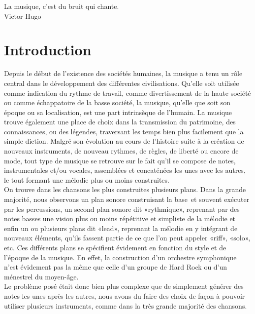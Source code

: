 \documentclass[12pt, a4paper]{article}
\begin{document}
    \tableofcontents
    
    \begin{center}
        La musique, c’est du bruit qui chante.\\
        Victor Hugo
    \end{center}
    
    \section*{Introduction}
        Depuis le début de l’existence des sociétés humaines, la musique a tenu un rôle central dans le développement des différentes civilisations.  Qu’elle soit utilisée comme indication du rythme de travail, comme divertissement de la haute société ou comme échappatoire de la basse société, la musique, qu’elle que soit son époque ou sa localisation, est une part intrinsèque de l’humain. La musique trouve également une place de choix dans la transmission du patrimoine, des connaissances, ou des légendes, traversant les temps bien plus facilement que la simple diction. Malgré son évolution au cours de l’histoire suite à la création de nouveaux instruments, de nouveau rythmes, de règles, de liberté ou encore de mode, tout type de musique se retrouve sur le fait qu’il se compose de notes, instrumentales et/ou vocales, assemblées et concaténées les unes avec les autres, le tout formant une mélodie plus ou moins construites.\\
        
        On trouve dans les chansons les plus construites plusieurs plans. Dans la grande majorité, nous observons un plan sonore construisant la base et souvent exécuter par les percussions, un second plan sonore dit «rythmique», reprenant par des notes basses une vision plus ou moins répétitive et simpliste de la mélodie et enfin un ou plusieurs plans dit «lead», reprenant la mélodie en y intégrant de nouveaux éléments, qu’ils fassent partie de ce que l’on peut appeler «riff», «solo», etc. Ces différents plans se spécifient évidement en fonction du style et de l’époque de la musique. En effet, la construction d’un orchestre symphonique n’est évidement pas la même que celle d’un groupe de Hard Rock ou d’un ménestrel du moyen-âge.\\
        
        Le problème posé était donc bien plus complexe que de simplement générer des notes les unes après les autres, nous avons du faire des choix de façon à pouvoir utiliser plusieurs instruments, comme dans la très grande majorité des chansons.
        
\end{document}
